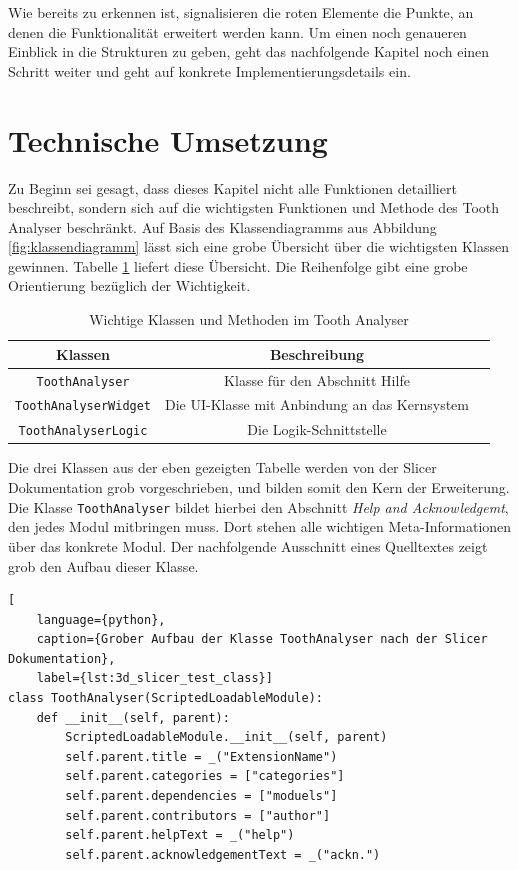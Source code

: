 Wie bereits zu erkennen ist, signalisieren die roten Elemente die Punkte, an denen
die Funktionalität erweitert werden kann. Um einen noch genaueren Einblick in
die Strukturen zu geben, geht das nachfolgende Kapitel noch einen Schritt weiter
und geht auf konkrete Implementierungsdetails ein.

\pagebreak

\section{Technische Umsetzung}
\label{sec:technische_umsetzung} Zu Beginn sei gesagt, dass dieses Kapitel nicht
alle Funktionen detailliert beschreibt, sondern sich auf die wichtigsten
Funktionen und Methode des Tooth Analyser beschränkt. Auf Basis des Klassendiagramms
aus Abbildung \ref{fig:klassendiagramm} lässt sich eine grobe Übersicht über die
wichtigsten Klassen gewinnen. Tabelle \ref{tab:methoden_klassen} liefert diese
Übersicht. Die Reihenfolge gibt eine grobe Orientierung bezüglich der Wichtigkeit.

\begin{table}[h]
	\centering
	\begin{tabular}{|c|c|c|}
		\hline
		\textbf{Klassen}             & \textbf{Beschreibung}                              \\
		\hline
		\texttt{ToothAnalyser}       & Klasse für den Abschnitt Hilfe                     \\
		\hline
		\texttt{ToothAnalyserWidget} & Die \ac{UI}-Klasse mit Anbindung an das Kernsystem \\
		\hline
		\texttt{ToothAnalyserLogic}  & Die Logik-Schnittstelle                            \\
		\hline
	\end{tabular}
	\caption{Wichtige Klassen und Methoden im Tooth Analyser}
	\label{tab:methoden_klassen}
\end{table}

Die drei Klassen aus der eben gezeigten Tabelle werden von der Slicer
Dokumentation grob vorgeschrieben, und bilden somit den Kern der Erweiterung.
Die Klasse \texttt{ToothAnalyser} bildet hierbei den Abschnitt \textit{Help and
Acknowledgemt}, den jedes Modul mitbringen muss. Dort stehen alle wichtigen Meta-Informationen
über das konkrete Modul. Der nachfolgende Ausschnitt eines Quelltextes zeigt grob
den Aufbau dieser Klasse.

\begin{lstlisting}[
    language={python},
    caption={Grober Aufbau der Klasse ToothAnalyser nach der Slicer Dokumentation},
    label={lst:3d_slicer_test_class}]
class ToothAnalyser(ScriptedLoadableModule):
    def __init__(self, parent):
	    ScriptedLoadableModule.__init__(self, parent)
	    self.parent.title = _("ExtensionName")
	    self.parent.categories = ["categories"]
	    self.parent.dependencies = ["moduels"]
	    self.parent.contributors = ["author"]
	    self.parent.helpText = _("help")
	    self.parent.acknowledgementText = _("ackn.")
\end{lstlisting}

